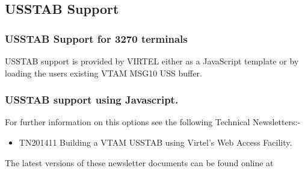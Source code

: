 \documentclass[letterpaper,10pt,english]{sphinxmanual}
\begin{document}

\ignorespaces 

\subsection{USSTAB Support}
\label{\detokenize{Installation_Guide:usstab-support}}\label{\detokenize{Installation_Guide:index-24}}

\subsubsection{USSTAB Support for 3270 terminals}
\label{\detokenize{Installation_Guide:usstab-support-for-3270-terminals}}
USSTAB support is provided by VIRTEL either as a JavaScript template or by loading the users existing VTAM MSG10 USS buffer.

\ignorespaces 

\subsubsection{USSTAB support using Javascript.}
\label{\detokenize{Installation_Guide:usstab-support-using-javascript}}\label{\detokenize{Installation_Guide:index-25}}
For further information on this options see the following Technical Newsletters:-
\begin{itemize}
\item {} 
TN201411 Building a VTAM USSTAB using Virtel’s Web Access Facility.

\end{itemize}

The latest versions of these newsletter documents can be found online at 

\ignorespaces 
\end{document}
